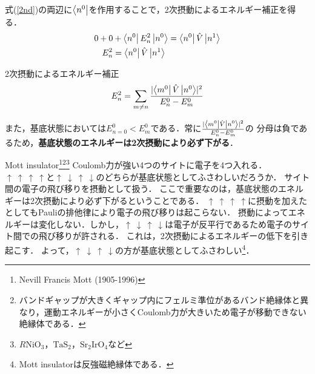 \documentclass{report}
\begin{document}
  式(\ref{2nd})の両辺に$\bra{n^0}$を作用することで，2次摂動によるエネルギー補正を得る．
  \begin{align}
    0+0&+\bra{n^0}E_n^2\ket{n^0}=\bra{n^0}\hat{V}\ket{n^1}\\
    E_n^2&=\bra{n^0}\hat{V}\ket{n^1}
  \end{align}
  \begin{itembox}[l]{2次摂動によるエネルギー補正}
  \begin{equation}
    E_n^2=\sum_{m\ne n}\frac{\lvert \bra{m^0}\hat{V}\ket{n^0}\rvert^2}{E_n^0-E_m^0}
  \end{equation}
  \end{itembox}
  また，基底状態においては$E_{n=0}^0 < E_m^0$である．常に$\frac{\lvert \bra{m^0}\hat{V}\ket{n^0}\rvert^2}{E_n^0-E_m^0}$の
  分母は負であるため，\textbf{基底状態のエネルギーは2次摂動により必ず下がる}．
  \begin{myex}{Mott insulator\footnote{
      Nevill Francis Mott (1905-1996)
    }\footnote{
      バンドギャップが大きくギャップ内にフェルミ準位があるバンド絶縁体と異なり，運動エネルギーが小さくCoulomb力が大きいため電子が移動できない絶縁体である．
    }\footnote{
      $R\mathrm{NiO_3，TaS_2，Sr_2IrO_4}$など
    }}{}
    Coulomb力が強い4つのサイトに電子を4つ入れる．
    $\uparrow \ \uparrow\ \uparrow\ \uparrow$と$\uparrow\ \downarrow\ \uparrow\ \downarrow$のどちらが基底状態としてふさわしいだろうか．
    サイト間の電子の飛び移りを摂動として扱う．
    ここで重要なのは，基底状態のエネルギーは2次摂動により必ず下がるということである．
    $\uparrow \ \uparrow\ \uparrow\ \uparrow$に摂動を加えたとしてもPauliの排他律により電子の飛び移りは起こらない．
    摂動によってエネルギーは変化しない．しかし，$\uparrow\ \downarrow\ \uparrow\ \downarrow$は電子が反平行であるため電子のサイト間での飛び移りが許される．
    これは，2次摂動によるエネルギーの低下を引き起こす．
    よって，$\uparrow\ \downarrow\ \uparrow\ \downarrow$の方が基底状態としてふさわしい\footnote{
      Mott insulatorは反強磁絶縁体である．
    }．
  \end{myex}
\end{document}
